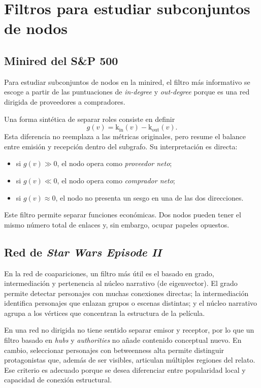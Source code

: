 \newpage
\section{Filtros para estudiar subconjuntos de nodos}

\subsection{Minired del S\&P 500}

Para estudiar subconjuntos de nodos en la minired, el filtro más informativo se escoge a partir de las puntuaciones de \textit{in-degree} y \textit{out-degree} porque es una red dirigida de proveedores a compradores.

Una forma sintética de separar roles consiste en definir
\[
 g(v)=\mathrm{k_{in}}(v)-\mathrm{k_{out}}(v).
\]
Esta diferencia no reemplaza a las métricas originales, pero resume el balance entre emisión y recepción dentro del subgrafo. Su interpretación es directa:
\begin{itemize}[leftmargin=1.5em]
    \item si $g(v)\gg 0$, el nodo opera como \emph{proveedor neto};
    \item si $g(v)\ll 0$, el nodo opera como \emph{comprador neto};
    \item si $g(v)\approx 0$, el nodo no presenta un sesgo en una de las dos direcciones.
\end{itemize}

Este filtro permite separar funciones económicas. Dos nodos pueden tener el mismo número total de enlaces y, sin embargo, ocupar papeles opuestos.

\subsection{Red de \textit{Star Wars Episode II}}

En la red de coapariciones, un filtro más útil es el basado en grado, intermediación y pertenencia al núcleo narrativo (de eigenvector). El grado permite detectar personajes con muchas conexiones directas; la intermediación identifica personajes que enlazan grupos o escenas distintas; y el núcleo narrativo agrupa a los vértices que concentran la estructura de la película.

En una red no dirigida no tiene sentido separar emisor y receptor, por lo que un filtro basado en \textit{hubs} y \textit{authorities} no añade contenido conceptual nuevo. En cambio, seleccionar personajes con betweenness alta permite distinguir protagonistas que, además de ser visibles, articulan múltiples regiones del relato. Ese criterio es adecuado porque se desea diferenciar entre popularidad local y capacidad de conexión estructural.
